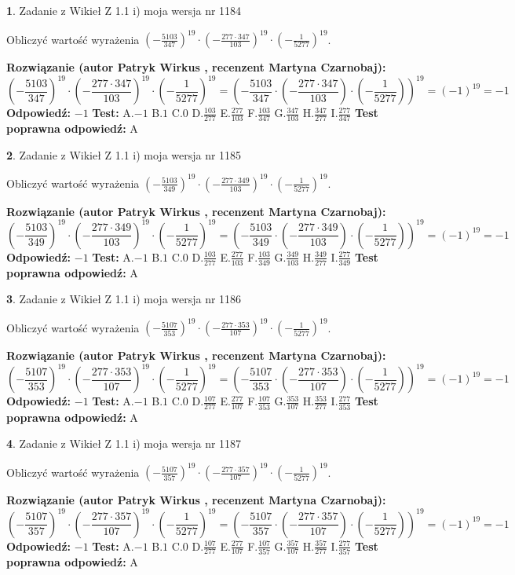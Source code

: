 \documentclass[12pt, a4paper]{article}
\theoremstyle{definition} %
\newtheorem{zad}{}
\newcommand{\zadStart}[1]{\begin{zad}#1\newline}
\newcommand{\zadStop}{\end{zad}}
\newcommand{\rozwStart}[2]{\noindent \textbf{Rozwiązanie (autor #1 , recenzent #2): }\newline}
\newcommand{\rozwStop}{\newline}
\newcommand{\odpStart}{\noindent \textbf{Odpowiedź:}\newline}
\newcommand{\odpStop}{\newline}
\newcommand{\testStart}{\noindent \textbf{Test:}\newline}
\newcommand{\testStop}{\newline}
\newcommand{\kluczStart}{\noindent \textbf{Test poprawna odpowiedź:}\newline}
\newcommand{\kluczStop}{\newline}
\begin{document}
\zadStart{Zadanie z Wikieł Z 1.1 i) moja wersja nr 1184}

Obliczyć wartość wyrażenia $(-\frac{5103}{347})^{19} \cdot (-\frac{277 \cdot 347}{103})^{19} \cdot (-\frac{1}{5277})^{19}$.
\zadStop
\rozwStart{Patryk Wirkus}{Martyna Czarnobaj}
$$(-\frac{5103}{347})^{19} \cdot (-\frac{277 \cdot 347}{103})^{19} \cdot (-\frac{1}{5277})^{19} = (-\frac{5103}{347} \cdot (-\frac{277 \cdot 347}{103}) \cdot (-\frac{1}{5277}))^{19} = (-1)^{19} = -1$$
\rozwStop
\odpStart
$-1$
\odpStop
\testStart
A.$-1$ B.$1$ C.$0$ D.$\frac{103}{277}$ E.$\frac{277}{103}$
F.$\frac{103}{347}$ G.$\frac{347}{103}$
H.$\frac{347}{277}$
I.$\frac{277}{347}$
\testStop
\kluczStart
A
\kluczStop



\zadStart{Zadanie z Wikieł Z 1.1 i) moja wersja nr 1185}

Obliczyć wartość wyrażenia $(-\frac{5103}{349})^{19} \cdot (-\frac{277 \cdot 349}{103})^{19} \cdot (-\frac{1}{5277})^{19}$.
\zadStop
\rozwStart{Patryk Wirkus}{Martyna Czarnobaj}
$$(-\frac{5103}{349})^{19} \cdot (-\frac{277 \cdot 349}{103})^{19} \cdot (-\frac{1}{5277})^{19} = (-\frac{5103}{349} \cdot (-\frac{277 \cdot 349}{103}) \cdot (-\frac{1}{5277}))^{19} = (-1)^{19} = -1$$
\rozwStop
\odpStart
$-1$
\odpStop
\testStart
A.$-1$ B.$1$ C.$0$ D.$\frac{103}{277}$ E.$\frac{277}{103}$
F.$\frac{103}{349}$ G.$\frac{349}{103}$
H.$\frac{349}{277}$
I.$\frac{277}{349}$
\testStop
\kluczStart
A
\kluczStop



\zadStart{Zadanie z Wikieł Z 1.1 i) moja wersja nr 1186}

Obliczyć wartość wyrażenia $(-\frac{5107}{353})^{19} \cdot (-\frac{277 \cdot 353}{107})^{19} \cdot (-\frac{1}{5277})^{19}$.
\zadStop
\rozwStart{Patryk Wirkus}{Martyna Czarnobaj}
$$(-\frac{5107}{353})^{19} \cdot (-\frac{277 \cdot 353}{107})^{19} \cdot (-\frac{1}{5277})^{19} = (-\frac{5107}{353} \cdot (-\frac{277 \cdot 353}{107}) \cdot (-\frac{1}{5277}))^{19} = (-1)^{19} = -1$$
\rozwStop
\odpStart
$-1$
\odpStop
\testStart
A.$-1$ B.$1$ C.$0$ D.$\frac{107}{277}$ E.$\frac{277}{107}$
F.$\frac{107}{353}$ G.$\frac{353}{107}$
H.$\frac{353}{277}$
I.$\frac{277}{353}$
\testStop
\kluczStart
A
\kluczStop



\zadStart{Zadanie z Wikieł Z 1.1 i) moja wersja nr 1187}

Obliczyć wartość wyrażenia $(-\frac{5107}{357})^{19} \cdot (-\frac{277 \cdot 357}{107})^{19} \cdot (-\frac{1}{5277})^{19}$.
\zadStop
\rozwStart{Patryk Wirkus}{Martyna Czarnobaj}
$$(-\frac{5107}{357})^{19} \cdot (-\frac{277 \cdot 357}{107})^{19} \cdot (-\frac{1}{5277})^{19} = (-\frac{5107}{357} \cdot (-\frac{277 \cdot 357}{107}) \cdot (-\frac{1}{5277}))^{19} = (-1)^{19} = -1$$
\rozwStop
\odpStart
$-1$
\odpStop
\testStart
A.$-1$ B.$1$ C.$0$ D.$\frac{107}{277}$ E.$\frac{277}{107}$
F.$\frac{107}{357}$ G.$\frac{357}{107}$
H.$\frac{357}{277}$
I.$\frac{277}{357}$
\testStop
\kluczStart
A
\kluczStop
\end{document}
